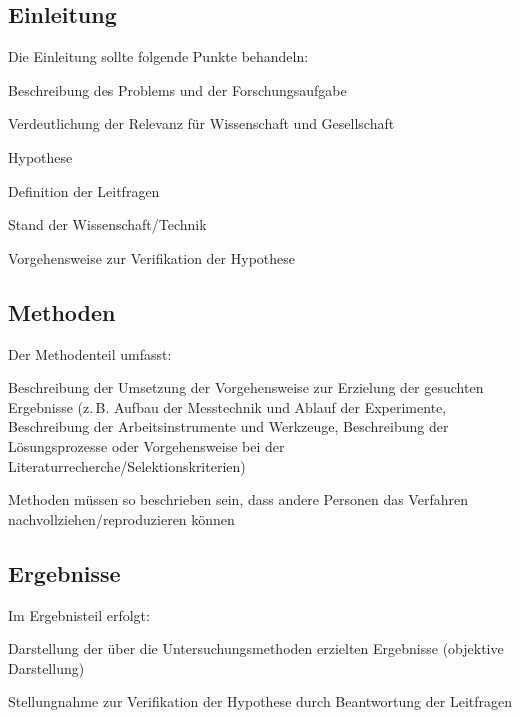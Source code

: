 \subsection{Einleitung}
\label{subsec:einleitung_struktur}

Die Einleitung sollte folgende Punkte behandeln:
\begin{listenabsatz}
	\item Beschreibung des Problems und der Forschungsaufgabe
	\item Verdeutlichung der Relevanz für Wissenschaft und Gesellschaft
	\item Hypothese
	\item Definition der Leitfragen
	\item Stand der Wissenschaft/Technik
	\item Vorgehensweise zur Verifikation der Hypothese
\end{listenabsatz}

\subsection{Methoden}
\label{subsec:methoden_struktur}

Der Methodenteil umfasst:
\begin{listenabsatz}
	\item Beschreibung der Umsetzung der Vorgehensweise zur Erzielung der gesuchten Ergebnisse (z.\,B. Aufbau der Messtechnik und Ablauf der Experimente, Beschreibung der Arbeitsinstrumente und Werkzeuge, Beschreibung der Lösungsprozesse oder Vorgehensweise bei der Literaturrecherche/Selektionskriterien)
	\item Methoden müssen so beschrieben sein, dass andere Personen das Verfahren nachvollziehen/reproduzieren können
\end{listenabsatz}

\subsection{Ergebnisse}
\label{subsec:ergebnisse_struktur}

Im Ergebnisteil erfolgt:
\begin{listenabsatz}
	\item Darstellung der über die Untersuchungsmethoden erzielten Ergebnisse (objektive Darstellung)
	\item Stellungnahme zur Verifikation der Hypothese durch Beantwortung der Leitfragen
\end{listenabsatz}

